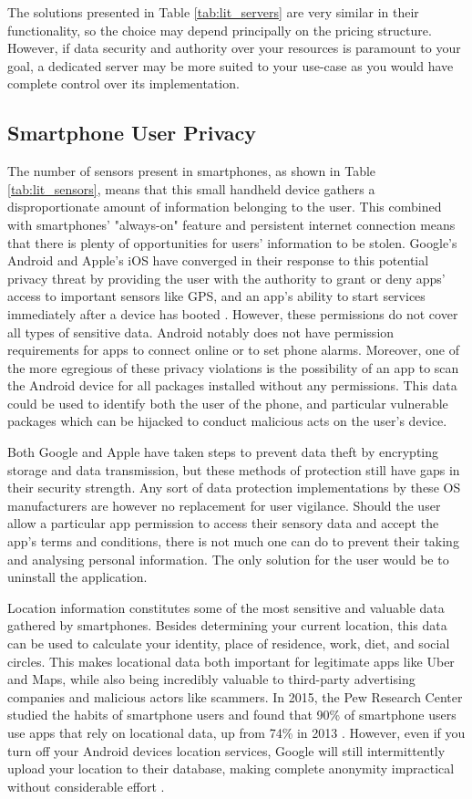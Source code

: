 The solutions presented in Table \ref{tab:lit_servers} are very similar in their functionality, so the choice may depend principally on the pricing structure. However, if data security and authority over your resources is paramount to your goal, a dedicated server may be more suited to your use-case as you would have complete control over its implementation.

\subsection{Smartphone User Privacy}
The number of sensors present in smartphones, as shown in Table \ref{tab:lit_sensors}, means that this small handheld device gathers a disproportionate amount of information belonging to the user. This combined with smartphones' "always-on" feature and persistent internet connection means that there is plenty of opportunities for users' information to be stolen. Google's Android and Apple's iOS have converged in their response to this potential privacy threat by providing the user with the authority to grant or deny apps' access to important sensors like GPS, and an app's ability to start services immediately after a device has booted \cite{RR-1393-DARPA}. However, these permissions do not cover all types of sensitive data. Android notably does not have permission requirements for apps to connect online or to set phone alarms. Moreover, one of the more egregious of these privacy violations is the possibility of an app to scan the Android device for all packages installed without any permissions. This data could be used to identify both the user of the phone, and particular vulnerable packages which can be hijacked to conduct malicious acts on the user's device\cite{RR-1393-DARPA}. 

Both Google and Apple have taken steps to prevent data theft by encrypting storage and data transmission, but these methods of protection still have gaps in their security strength. Any sort of data protection implementations by these OS manufacturers are however no replacement for user vigilance. Should the user allow a particular app permission to access their sensory data and accept the app's terms and conditions, there is not much one can do to prevent their taking and analysing personal information. The only solution for the user would be to uninstall the application.

Location information constitutes some of the most sensitive and valuable data gathered by smartphones. Besides determining your current location, this data can be used to calculate your identity, place of residence, work, diet, and social circles. This makes locational data both important for legitimate apps like Uber and Maps, while also being incredibly valuable to third-party advertising companies and malicious actors like scammers. In 2015, the Pew Research Center studied the habits of smartphone users and found that 90\% of smartphone users use apps that rely on locational data, up from 74\% in 2013 \cite{Anderson2016}. However, even if you turn off your Android devices location services, Google will still intermittently upload your location to their database, making complete anonymity impractical without considerable effort \cite{AssociatedPress2018}.
